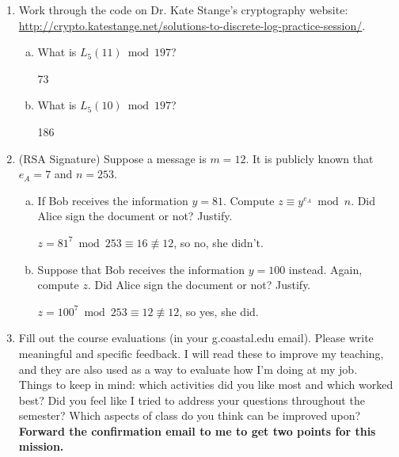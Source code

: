 \documentclass[12pt]{amsart}
\theoremstyle{plain}
\theoremstyle{definition}
\begin{document}
\begin{enumerate}[1.]
	\item Work through the code on Dr. Kate Stange's cryptography website: \url{http://crypto.katestange.net/solutions-to-discrete-log-practice-session/}.  
		\begin{enumerate}[a.]
			\item What is $L_5(11) \bmod 197$?
			\begin{framed}
			73
			\end{framed}
			\item What is $L_5(10) \bmod 197$?
			\begin{framed}
			186
			\end{framed}
		\end{enumerate}
	\item (RSA Signature) Suppose a message is $m = 12$.  It is publicly known that $e_A = 7$ and $n = 253$.
			\begin{enumerate}[a.]
			\item If Bob receives the information $y = 81$.  Compute $z \equiv y^{e_A} \bmod n$.  Did Alice sign the document or not?  Justify.
			\begin{framed}
			$z = 81^7 \bmod 253 \equiv 16 \not\equiv 12$, so no, she didn't.
			\end{framed}
			 \item Suppose that Bob receives the information $y = 100$ instead.  Again, compute $z$.  Did Alice sign the document or not?  Justify.
			\begin{framed}
			$z = 100^7 \bmod 253 \equiv 12 \not\equiv 12$, so yes, she did.
			\end{framed}
		\end{enumerate}
	\item Fill out the course evaluations (in your g.coastal.edu email). Please write meaningful and specific feedback.  I will read these to improve my teaching, and they are also used as a way to evaluate how I'm doing at my job.\\
	Things to keep in mind: which activities did you like most and which worked best?  Did you feel like I tried to address your questions throughout the semester?  Which aspects of class do you think can be improved upon?  \textbf{Forward the confirmation email to me to get two points for this mission.}\\
	

\end{enumerate}
\end{document}
